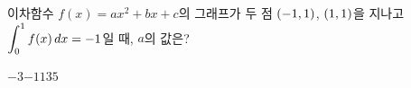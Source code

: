이차함수 $f(x)=ax^2+bx+c$의 그래프가 두 점 $(-1{,}\mkern3mu\mathopen{}1)$, $(1{,}\mkern3mu\mathopen{}1)$을 지나고 $\displaystyle\int_{0}^{1}f(x)\mkern3mu dx=-1$일 때, $a$의 값은? 
\begin{choices32}{$-3$}{$-1$}{$1$}{$3$}{$5$}\end{choices32}
